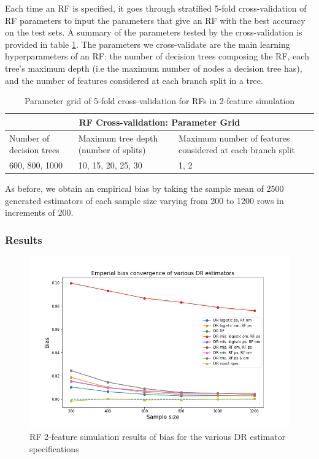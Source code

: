 \documentclass[12pt,twoside]{article}
\begin{document}
Each time an RF is specified, it goes through stratified 5-fold cross-validation of RF parameters to input the parameters that give an RF with the best accuracy on the test sets. A summary of the parameters tested by the cross-validation is provided in table \ref{tableRF}. The parameters we cross-validate are the main learning hyperparameters of an RF: the number of decision trees composing the RF, each tree's maximum depth (i.e the maximum number of nodes a decision tree has), and the number of features considered at each branch split in a tree. \\
\begin{table}[]
    \centering
\begin{tabular}{ |p{3cm}|p{3cm}|p{3cm}| }
 \hline
 \multicolumn{3}{|c|}{RF Cross-validation: Parameter Grid} \\
 \hline
 Number of decision trees & Maximum tree depth (number of splits)  & Maximum    number of features considered at each branch split\\
 \hline
 600, 800, 1000& 10, 15, 20, 25, 30 & 1, 2 \\
 \hline 
\end{tabular}
\caption{Parameter grid of 5-fold cross-validation for RFs in 2-feature simulation}
\label{tableRF}
\end{table}

As before, we obtain an empirical bias by taking the sample mean of 2500 generated estimators of each sample size varying from 200 to 1200 rows in increments of 200. 

\subsubsection*{Results}

\begin{figure}[h!]
    \centering
    \includegraphics[width = 0.9\columnwidth]{figures/biasRF.png}
    \caption{RF 2-feature simulation results of bias for the various DR estimator specifications}
    \label{figbiasRF}
\end{figure}
\end{document}

